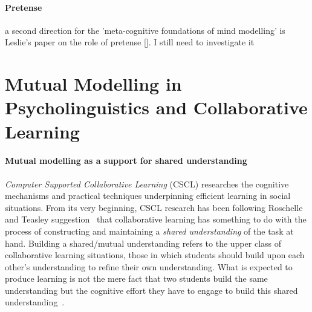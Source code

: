 \documentclass{sig-alternate}
\begin{document}
\paragraph{Pretense}

a second direction for the 'meta-cognitive foundations of mind modelling' is
Leslie's paper on the role of pretense []. I still need to investigate it




\section{Mutual Modelling in Psycholinguistics and Collaborative Learning}

\paragraph{Mutual modelling as a support for shared understanding}

\emph{Computer Supported Collaborative Learning} (CSCL) researches the cognitive
mechanisms and practical techniques underpinning efficient learning in social
situations. From its very beginning, CSCL research has been following
Roschelle and Teasley suggestion~\cite{roschelle1995construction} that
collaborative learning has something to do with the process of constructing and
maintaining a \emph{shared understanding} of the task at hand. Building a shared/mutual
understanding refers to the upper class of collaborative learning situations,
those in which students should build upon each other's understanding to refine
their own understanding.  What is expected to produce learning is not the mere
fact that two students build the same understanding but the cognitive effort
they have to engage to build this shared
understanding~\cite{schwartz1995emergence}.
\end{document}
